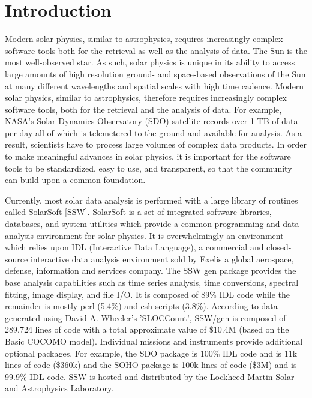\section{Introduction}
Modern solar physics, similar to astrophysics, requires increasingly complex software 
tools both for the retrieval as well as the analysis of data. The Sun is the most well-observed 
star. As such, solar physics is unique in its ability to access large amounts of high 
resolution ground- and space-based observations of the Sun at many different wavelengths 
and spatial scales with high time cadence. Modern solar physics, similar to astrophysics, 
therefore requires increasingly complex software tools, both for the retrieval and the 
analysis of data. For example, NASA's Solar Dynamics Observatory (SDO) satellite records 
over 1 TB of data per day all of which is telemetered to the ground and available for 
analysis. As a result, scientists have to process large volumes of complex data products. 
In order to make meaningful advances in solar physics, it is important for the software 
tools to be standardized, easy to use, and transparent, so that the community can build 
upon a common foundation.

Currently, most solar data analysis is performed with a large library of routines called 
SolarSoft [SSW]. SolarSoft is a set of integrated software libraries, databases, and 
system utilities which provide a common programming and data analysis environment for
solar physics. It is overwhelmingly an environment which relies upon IDL (Interactive Data Language),
a commercial and closed-source interactive data analysis environment sold by 
Exelis a global aerospace, defense, information and services company. The SSW gen package
provides the base analysis capabilities such as time series analysis, time conversions,
spectral fitting, image display, and file I/O. It is composed of 89\% IDL code while the remainder
is mostly perl (5.4\%) and csh scripts (3.8\%). According to data generated using 
David A. Wheeler's 'SLOCCount', SSW/gen is composed of 289,724 lines of code with a total approximate
value of \$10.4M (based on the Basic COCOMO model). 
Individual missions and instruments provide additional optional packages. For example, 
the SDO package is 100\% IDL code and is 11k lines of code (\$360k) and the SOHO package is
100k lines of code (\$3M) and is 99.9\% IDL code. SSW is hosted and distributed by the 
Lockheed Martin Solar and Astrophysics Laboratory.


